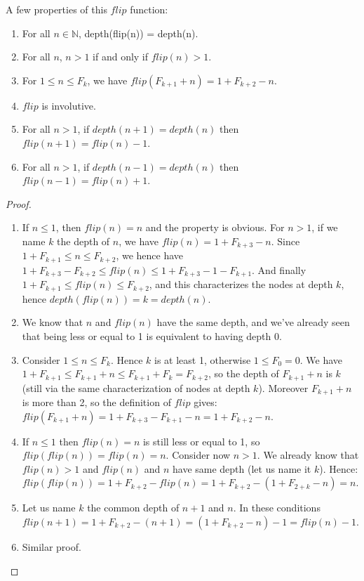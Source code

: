 \documentclass[a4paper,11pt]{article}
\begin{document}
A few properties of this $flip$ function:
\begin{theorem}\label{flipprops}
\noindent
\begin{enumerate}
\item For all $n\in\mathbb{N}$, depth(flip(n)) = depth(n).
\item For all $n$, $n>1$ if and only if $flip(n)>1$.
\item For $1 \le n \le F_{k}$, we have
 $flip(F_{k+1}+n) = 1+F_{k+2}-n$.
\item $flip$ is involutive.
\item For all $n>1$, if $depth(n+1)=depth(n)$ then
  $flip(n+1)=flip(n)-1$.
\item For all $n>1$, if $depth(n-1)=depth(n)$ then
  $flip(n-1)=flip(n)+1$.
\end{enumerate}
\end{theorem}
\begin{proof}
\noindent
\begin{enumerate}
\item If $n\le 1$, then $flip(n)=n$ and the property is obvious.
For $n>1$, if we name $k$ the depth of $n$, we have
$flip(n) = 1+F_{k+3}-n$. Since $1+F_{k+1} \le n \le F_{k+2}$,
we hence have $1+F_{k+3}-F_{k+2} \le flip(n) \le 1+F_{k+3}-1-F_{k+1}$.
And finally $1+F_{k+1} \le flip(n) \le F_{k+2}$, and this characterizes
the nodes at depth $k$, hence $depth(flip(n))=k=depth(n)$.
\item We know that $n$ and $flip(n)$ have the same depth, and
we've already seen that being less or equal to 1 is equivalent
to having depth 0.
\item Consider $1 \le n \le F_{k}$. Hence $k$ is at least 1,
otherwise $1 \le F_0 = 0$. We have
$1+F_{k+1}\le F_{k+1}+n \le F_{k+1}+F_{k} = F_{k+2}$, so the depth
of $F_{k+1}+n$ is $k$
(still via the same characterization of nodes at depth $k$).
Moreover $F_{k+1}+n$ is more than 2,
so the definition of $flip$ gives:
$flip(F_{k+1}+n)=1+F_{k+3}-F_{k+1}-n = 1+F_{k+2}-n$.
\item If $n\le 1$ then $flip(n)=n$ is still less or equal to 1,
so $flip(flip(n))=flip(n)=n$.
Consider now $n>1$. We already know that $flip(n)>1$ and
$flip(n)$ and $n$ have same depth (let us name it $k$). Hence:
$flip(flip(n)) = 1+F_{k+2}-flip(n)=1+F_{k+2}-(1+F_{2+k}-n) = n$.
\item Let us name $k$ the common depth of $n+1$ and $n$.
In these conditions
$flip(n+1) = 1+F_{k+2}-(n+1) = (1+F_{k+2}-n)-1 = flip(n)-1$.
\item Similar proof.
\end{enumerate}
\end{proof}
\end{document}
